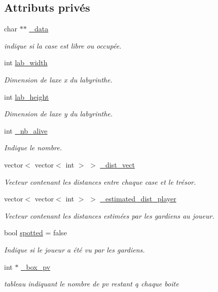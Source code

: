 \subsection*{Attributs privés}
\begin{DoxyCompactItemize}
\item 
char $\ast$$\ast$ \hyperlink{classLabyrinthe_a93ccbd26c14359bec6a9898575f69237}{\+\_\+data}
\begin{DoxyCompactList}\small\item\em indique si la case est libre ou occupée. \end{DoxyCompactList}\item 
int \hyperlink{classLabyrinthe_a6ae1d76761645024106ad6374305dd02}{lab\+\_\+width}
\begin{DoxyCompactList}\small\item\em Dimension de l\textquotesingle{}axe \textquotesingle{}x\textquotesingle{} du labyrinthe. \end{DoxyCompactList}\item 
int \hyperlink{classLabyrinthe_af48dc244a25af5aac1a9fca668dee82d}{lab\+\_\+height}
\begin{DoxyCompactList}\small\item\em Dimension de l\textquotesingle{}axe \textquotesingle{}y\textquotesingle{} du labyrinthe. \end{DoxyCompactList}\item 
int \hyperlink{classLabyrinthe_ad97a56882b720fa0f94acffde1d2c275}{\+\_\+nb\+\_\+alive}
\begin{DoxyCompactList}\small\item\em Indique le nombre. \end{DoxyCompactList}\item 
vector$<$ vector$<$ int $>$ $>$ \hyperlink{classLabyrinthe_a63f1ac088c5b93cd8c099e7cce3ef4dc}{\+\_\+dist\+\_\+vect}
\begin{DoxyCompactList}\small\item\em Vecteur contenant les distances entre chaque case et le trésor. \end{DoxyCompactList}\item 
vector$<$ vector$<$ int $>$ $>$ \hyperlink{classLabyrinthe_a09a19bc0082a98842deb7426ef945c1b}{\+\_\+estimated\+\_\+dist\+\_\+player}
\begin{DoxyCompactList}\small\item\em Vecteur contenant les distances estimées par les gardiens au joueur. \end{DoxyCompactList}\item 
bool \hyperlink{classLabyrinthe_a228978d8d96f63a3e97b07c7d04b3594}{spotted} = false
\begin{DoxyCompactList}\small\item\em Indique si le joueur a été vu par les gardiens. \end{DoxyCompactList}\item 
int $\ast$ \hyperlink{classLabyrinthe_abadb9e695ee1bdcf1467611f62ff374e}{\+\_\+box\+\_\+pv}
\begin{DoxyCompactList}\small\item\em tableau indiquant le nombre de pv restant ą chaque boite \end{DoxyCompactList}\end{DoxyCompactItemize}
